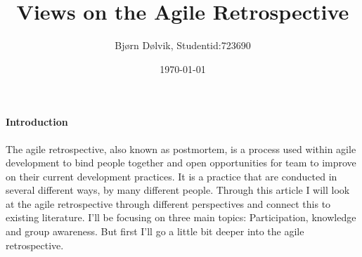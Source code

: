 \documentclass[12pt]{article}
\begin{document}
\title{Views on the Agile Retrospective}
\date{\today{}}
\author{Bjørn Dølvik, Studentid:723690}

\maketitle

\paragraph{Introduction}
The agile retrospective, also known as postmortem, is a process used within agile development to bind people together and open opportunities for team to improve on their current development practices. It is a practice that are conducted in several different ways, by many different people. Through this article I will look at the agile retrospective through different perspectives and connect this to existing literature. I'll be focusing on three main topics: Participation, knowledge and group awareness. But first I'll go a little bit deeper into the agile retrospective.
\end{document}
